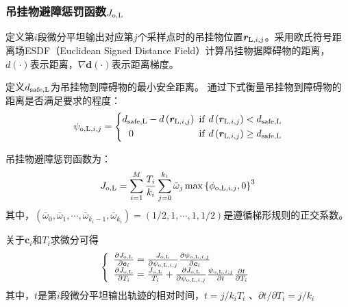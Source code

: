 \subsubsection{吊挂物避障惩罚函数$J_{\rm{o,L}}$}
定义第$i$段微分平坦输出对应第$j$个采样点时的吊挂物位置${\boldsymbol{r}}_{{\rm{L}},i,j}$。采用欧氏符号距离场ESDF（Euclidean Signed Distance Field）计算吊挂物据障碍物的距离，$d(\cdot)$表示距离，$\nabla \boldsymbol{d}(\cdot)$表示距离梯度。

定义$d_{\rm{safe, L}}$为吊挂物到障碍物的最小安全距离。
通过下式衡量吊挂物到障碍物的距离是否满足要求的程度：
\begin{equation}\label{psi_o_L_i_j}
    \psi_{{\rm{o,L}},i,j} = \left\{
        \begin{aligned}
            d_{\rm{safe, L}} - d\left({\boldsymbol{r}}_{{\rm{L}},i,j}\right) \,\, {\rm{if}} \,\, d\left({\boldsymbol{r}}_{{\rm{L}},i,j}\right) < d_{\rm{safe, L}}\\
            0 \,\,\,\,\,\,\,\,\,\,\,\,\,\,\,\,\,\,\,\,\,\,\,\,\,\,\,\,\,\,\,\,\,\,\,\,\,\,\,\,\, {\rm{if}} \,\, d\left({\boldsymbol{r}}_{{\rm{L}},i,j}\right) \ge d_{\rm{safe, L}}
        \end{aligned}
    \right.
\end{equation}

吊挂物避障惩罚函数为：
\begin{equation}\label{J_o_L}
    J_{\rm{o,L}} = \sum\limits_{i=1}^{M}\frac{T_i}{k_i}\sum\limits_{j=0}^{k_i}\bar{\omega}_j\max\left\{
        \phi_{{\rm{o,L}},i,j} ,0
    \right\}^3
\end{equation}
其中，$\left(\bar{\omega}_0, \bar{\omega}_1, \cdots, \bar{\omega}_{k_i-1}, \bar{\omega}_{k_i}\right) = \left(1/2, 1, \cdots, 1, 1/2\right)$是遵循梯形规则的正交系数。

关于$\boldsymbol{c}_i$和$T_i$求微分可得
\begin{equation}\label{partial_J_o_L}
\left\{\begin{array}{l}
    \frac{\partial J_{\rm{o,L}}}{\partial \boldsymbol{c}_{i}} = \frac{J_{\rm{o,L}}}{\partial \psi_{{\rm{o,L}},i,j}}\frac{\partial \psi_{{\rm{o,L}},i,j}}{\partial \boldsymbol{c}_{i}}\\
    \frac{\partial J_{\rm{o,L}}}{\partial T_i} = \frac{J_{\rm{o,L}}}{T_i} + \frac{\partial J_{\rm{o,L}}}{\partial \psi_{{\rm{o,L}},i,j}}\frac{\psi_{{\rm{o,L}},i,j}}{\partial t}\frac{\partial t}{\partial T_i}
    \end{array}
    \right.
\end{equation}
其中，$t$是第$i$段微分平坦输出轨迹的相对时间，$t = {j}/{k_i}T_i$
、${\partial t}/{\partial T_i} = {j}/{k_i}$

